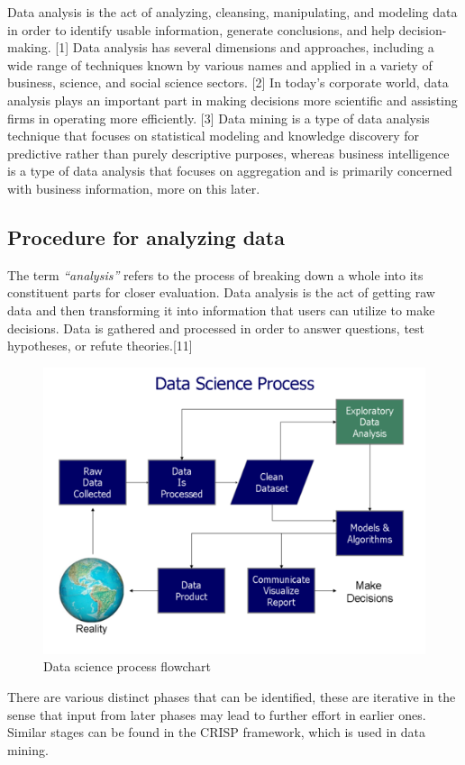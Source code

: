 Data analysis is the act of analyzing, cleansing, manipulating, and modeling data in order to identify usable information, generate conclusions, and help decision-making. [1] Data analysis has several dimensions and approaches, including a wide range of techniques known by various names and applied in a variety of business, science, and social science sectors. [2] In today's corporate world, data analysis plays an important part in making decisions more scientific and assisting firms in operating more efficiently. [3]
Data mining is a type of data analysis technique that focuses on statistical modeling and knowledge discovery for predictive rather than purely descriptive purposes, whereas business intelligence is a type of data analysis that focuses on aggregation and is primarily concerned with business information, more on this later.

\subsection{Procedure for analyzing data}
The term \textit{``analysis''} refers to the process of breaking down a whole into its constituent parts for closer evaluation.
Data analysis is the act of getting raw data and then transforming it into information that users can utilize to make decisions.
Data is gathered and processed in order to answer questions, test hypotheses, or refute theories.[11]

\begin{figure}[ht]
    \centering
    \includegraphics[width=\linewidth]{content/chapter_1/images/Data_visualization_process_v1.png}
    \caption{Data science process flowchart \cite{Book:doing_data_science}}
    \label{fig:data-science-flowchart}
\end{figure}
There are various distinct phases that can be identified, these are iterative in the sense that input from later phases may lead to further effort in earlier ones.
Similar stages can be found in the CRISP framework, which is used in data mining. 